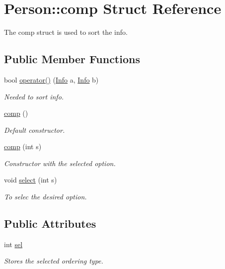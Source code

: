 \hypertarget{struct_person_1_1comp}{\section{Person\+:\+:comp Struct Reference}
\label{struct_person_1_1comp}
}


The comp struct is used to sort the info.  


\subsection*{Public Member Functions}
\begin{DoxyCompactItemize}
\item 
bool \hyperlink{struct_person_1_1comp_ac4cb7f88f120bf8b332a837307ae3476}{operator()} (\hyperlink{struct_info}{Info} a, \hyperlink{struct_info}{Info} b)
\begin{DoxyCompactList}\small\item\em Needed to sort info. \end{DoxyCompactList}\item 
\hyperlink{struct_person_1_1comp_a5272710b2721399c612bcdad1b1cead7}{comp} ()
\begin{DoxyCompactList}\small\item\em Default constructor. \end{DoxyCompactList}\item 
\hyperlink{struct_person_1_1comp_a9b8f4d9214660d695cc375b9a46cc8ec}{comp} (int s)
\begin{DoxyCompactList}\small\item\em Constructor with the selected option. \end{DoxyCompactList}\item 
void \hyperlink{struct_person_1_1comp_af552a34297c810b79725508e2d5d810a}{select} (int s)
\begin{DoxyCompactList}\small\item\em To selec the desired option. \end{DoxyCompactList}\end{DoxyCompactItemize}
\subsection*{Public Attributes}
\begin{DoxyCompactItemize}
\item 
int \hyperlink{struct_person_1_1comp_a85555416f9f001302f50825aa149ced3}{sel}
\begin{DoxyCompactList}\small\item\em Stores the selected ordering type. \end{DoxyCompactList}\end{DoxyCompactItemize}


